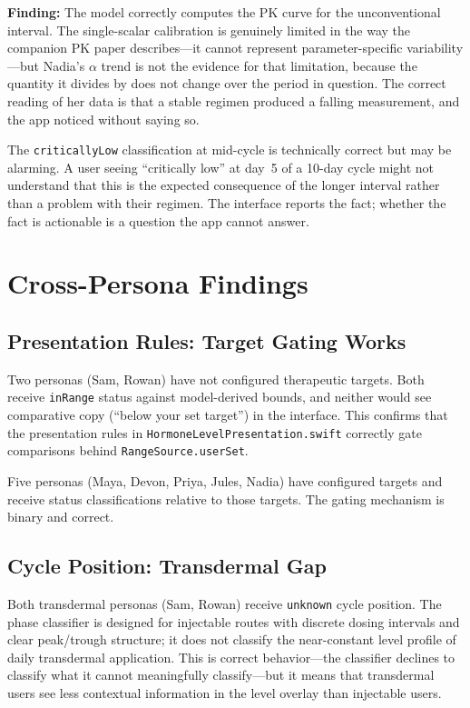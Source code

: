 \documentclass[11pt,a4paper]{article}
\newcommand{\code}[1]{\texttt{\small #1}}
\begin{document}
\textbf{Finding:} The model correctly computes the PK curve for the
unconventional interval. The single-scalar calibration is genuinely limited
in the way the companion PK paper describes---it cannot represent
parameter-specific variability---but Nadia's $\alpha$ trend is not the
evidence for that limitation, because the quantity it divides by does not
change over the period in question. The correct reading of her data is that
a stable regimen produced a falling measurement, and the app noticed
without saying so.

The \code{criticallyLow} classification at mid-cycle is technically correct
but may be alarming. A user seeing ``critically low'' at day~5 of a 10-day
cycle might not understand that this is the expected consequence of the
longer interval rather than a problem with their regimen. The interface
reports the fact; whether the fact is actionable is a question the app
cannot answer.

\section{Cross-Persona Findings}
\label{sec:cross}

\subsection{Presentation Rules: Target Gating Works}

Two personas (Sam, Rowan) have not configured therapeutic targets. Both
receive \code{inRange} status against model-derived bounds, and neither
would see comparative copy (``below your set target'') in the interface.
This confirms that the presentation rules in
\code{HormoneLevelPresentation.swift} correctly gate comparisons behind
\code{RangeSource.userSet}.

Five personas (Maya, Devon, Priya, Jules, Nadia) have configured targets and
receive status classifications relative to those targets. The gating
mechanism is binary and correct.

\subsection{Cycle Position: Transdermal Gap}

Both transdermal personas (Sam, Rowan) receive \code{unknown} cycle
position. The phase classifier is designed for injectable routes with
discrete dosing intervals and clear peak/trough structure; it does not
classify the near-constant level profile of daily transdermal application.
This is correct behavior---the classifier declines to classify what it
cannot meaningfully classify---but it means that transdermal users see less
contextual information in the level overlay than injectable users.
\end{document}
